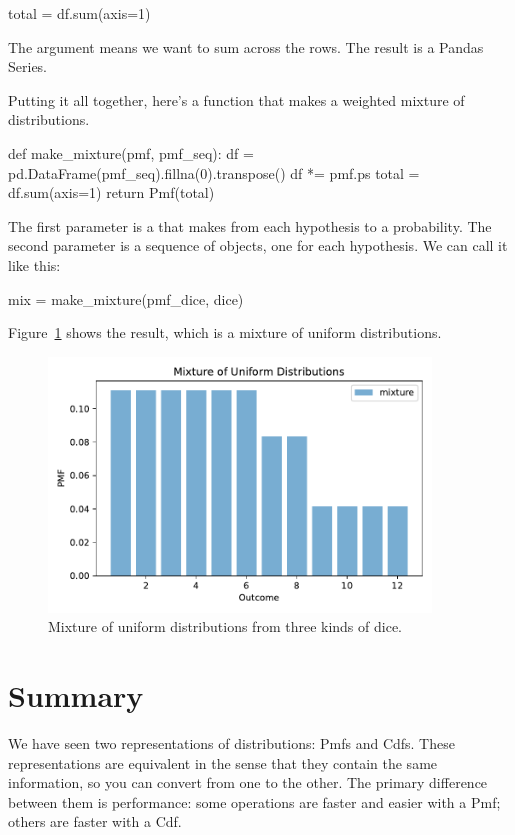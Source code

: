 \documentclass[12pt]{book}
\theoremstyle{exercise}
\begin{document}
\begin{code}
total = df.sum(axis=1)
\end{code}

The argument  means we want to sum across the rows.
The result is a Pandas Series.

Putting it all together, here's a function that makes a weighted mixture of distributions.

\begin{code}
def make_mixture(pmf, pmf_seq):
    df = pd.DataFrame(pmf_seq).fillna(0).transpose()
    df *= pmf.ps
    total = df.sum(axis=1)
    return Pmf(total)
\end{code}


The first parameter is a  that makes from each hypothesis to a probability.
The second parameter is a sequence of  objects, one for each hypothesis.
We can call it like this:

\begin{code}
mix = make_mixture(pmf_dice, dice)
\end{code}

Figure~\ref{fig06-04} shows the result, which is a mixture of uniform distributions.

\begin{figure}
\centerline{\includegraphics[width=4in]{figs/fig06-04.pdf}}
\caption{Mixture of uniform distributions from three kinds of dice.}
\label{fig06-04}
\end{figure}



\section{Summary}


We have seen two representations of distributions: Pmfs and Cdfs.
These representations are equivalent in the sense that they contain
the same information, so you can convert from one to the other.  The
primary difference between them is performance: some operations are
faster and easier with a Pmf; others are faster with a Cdf.
 
\end{document}
